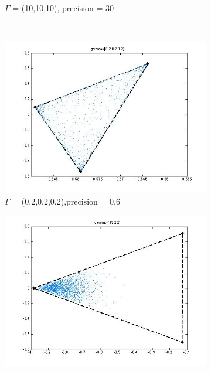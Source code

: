 \documentclass[14pt]{book}
\begin{document}
\begin{figure}
\begin{subfigure}[b]{0.3\textwidth}
                \caption{$\Gamma$ = (10,10,10), precision = 30}
                \label{fig:tiger}
        \end{subfigure}
        ~ %
        \begin{subfigure}[b]{0.3\textwidth}
                \centering
                \includegraphics[width=\textwidth]{(2,2,2).jpg}
                \caption{$\Gamma$ = (0.2,0.2,0.2),precision = 0.6}
                \label{fig:mouse}
        \end{subfigure}
        \caption{Pictures of different precision}\label{fig:animals}
        \centering
        \begin{subfigure}[b]{0.3\textwidth}
                \centering
                \includegraphics[width=\textwidth]{(15,2,2).jpg}

\end{subfigure}
\end{figure}
\end{document}
